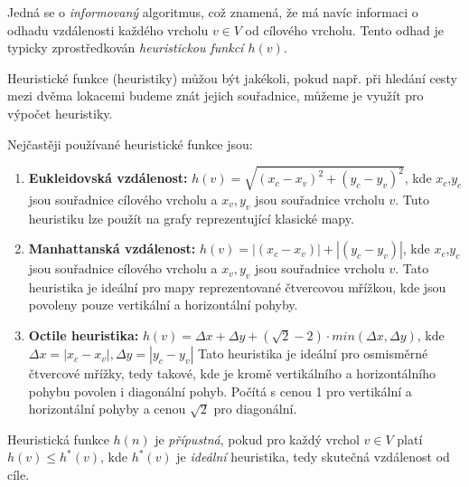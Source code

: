 \documentclass[12pt]{report}			%
\begin{document}
			Jedná se o \emph{informovaný} algoritmus, což znamená, že má navíc informaci o odhadu vzdálenosti každého vrcholu $v \in V$ od cílového vrcholu. 
			Tento odhad je typicky zprostředkován \emph{heuristickou funkcí $h(v)$}.
			
			Heuristické funkce (heuristiky) můžou být jakékoli, pokud např. při hledání cesty mezi dvěma lokacemi budeme znát jejich souřadnice, můžeme je využít pro výpočet heuristiky. %

			Nejčastěji používané heuristické funkce jsou:
			\begin{enumerate}
			
\item \textbf{Eukleidovská vzdálenost:} $h(v) = \sqrt{(x_c - x_v)^2 + (y_c - y_v)^2}$, kde $x_c$,$y_c$ jsou souřadnice cílového vrcholu a $x_v, y_v$ jsou souřadnice vrcholu $v$. Tuto heuristiku lze použít na grafy reprezentující klasické mapy.

\item \textbf{Manhattanská vzdálenost:} $h(v) = |(x_c - x_v)| +
|(y_c - y_v)|$, kde $x_c$,$y_c$ jsou souřadnice cílového vrcholu a $x_v, y_v$ jsou souřadnice vrcholu $v$. Tato heuristika je ideální pro mapy reprezentované čtvercovou mřížkou, kde jsou povoleny pouze vertikální a horizontální pohyby.

\item \textbf{Octile heuristika:} $h(v) = \Delta x+ \Delta y + (\sqrt{2}-2) \cdot min(\Delta x, \Delta y)$, kde $\Delta x = |x_c - x_v|, \Delta y = |y_c - y_v|$ %
Tato heuristika je ideální pro osmisměrné čtvercové mřížky, tedy takové, kde je kromě vertikálního a horizontálního pohybu povolen i diagonální pohyb. Počítá s cenou 1 pro vertikální a horizontální pohyby a cenou $\sqrt{2}$ pro diagonální.
\end{enumerate}
Heuristická funkce $h(n)$ je \emph{přípustná}, pokud pro každý vrchol $v \in V$ platí $h(v) \leq h^*(v)$, kde $h^*(v)$ je \emph{ideální} heuristika, tedy skutečná vzdálenost od cíle.
			
\end{document}
